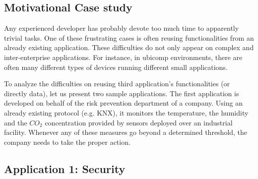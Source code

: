 
% 
% 
\subsection{Motivational Case study}

Any experienced developer has probably devote too much time to apparently trivial tasks.
One of these frustrating cases is often reusing functionalities from an already existing application.
These difficulties do not only appear on complex and inter-enterprise applications. %
For instance, in \ac{ubicomp} environments, there are often many different types of devices running different small applications. %


To analyze the difficulties on reusing third application's functionalities (or directly data), let us present two sample applications.
The first application is developed on behalf of the risk prevention department of a company. %
Using an already existing protocol (e.g. KNX), it monitors the temperature, the humidity and the $CO_2$ concentration provided by sensors deployed over an industrial facility.
Whenever any of these measures go beyond a determined threshold, the company needs to take the proper action.




\subsection{Application 1: Security}

